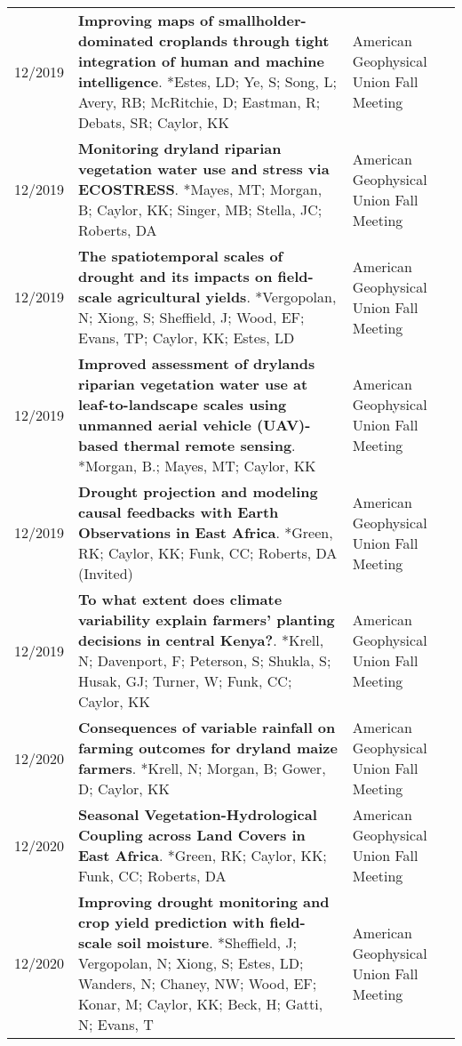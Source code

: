 \begin{longtable}{lp{10.0cm}p{4.5cm}}
12/2019 & {\bf Improving maps of smallholder-dominated croplands through tight integration of human and machine intelligence}. *Estes, LD; Ye, S; Song, L; Avery, RB; McRitchie, D; Eastman, R; Debats, SR; Caylor, KK  & American Geophysical Union Fall Meeting \\
  
12/2019 & {\bf Monitoring dryland riparian vegetation water use and stress via ECOSTRESS}. *Mayes, MT; Morgan, B; Caylor, KK; Singer, MB; Stella, JC; Roberts, DA  & American Geophysical Union Fall Meeting \\
  
12/2019 & {\bf The spatiotemporal scales of drought and its impacts on field-scale agricultural yields}. *Vergopolan, N; Xiong, S; Sheffield, J; Wood, EF; Evans, TP; Caylor, KK; Estes, LD  & American Geophysical Union Fall Meeting \\
  
12/2019 & {\bf Improved assessment of drylands riparian vegetation water use at leaf-to-landscape scales using unmanned aerial vehicle (UAV)-based thermal remote sensing}. *Morgan, B.; Mayes, MT; Caylor, KK  & American Geophysical Union Fall Meeting \\
  
12/2019 & {\bf Drought projection and modeling causal feedbacks with Earth Observations in East Africa}. *Green, RK; Caylor, KK; Funk, CC; Roberts, DA  (Invited)  & American Geophysical Union Fall Meeting \\
  
12/2019 & {\bf To what extent does climate variability explain farmers' planting decisions in central Kenya?}. *Krell, N; Davenport, F; Peterson, S; Shukla, S; Husak, GJ; Turner, W; Funk, CC; Caylor, KK  & American Geophysical Union Fall Meeting \\
  
12/2020 & {\bf Consequences of variable rainfall on farming outcomes for dryland maize farmers}. *Krell, N; Morgan, B; Gower, D; Caylor, KK  & American Geophysical Union Fall Meeting \\
  
12/2020 & {\bf Seasonal Vegetation-Hydrological Coupling across Land Covers in East Africa}. *Green, RK; Caylor, KK; Funk, CC; Roberts, DA  & American Geophysical Union Fall Meeting \\
  
12/2020 & {\bf Improving drought monitoring and crop yield prediction with field-scale soil moisture}. *Sheffield, J; Vergopolan, N; Xiong, S; Estes, LD; Wanders, N; Chaney, NW; Wood, EF; Konar, M; Caylor, KK; Beck, H; Gatti, N; Evans, T  & American Geophysical Union Fall Meeting \\
  

\end{longtable}
